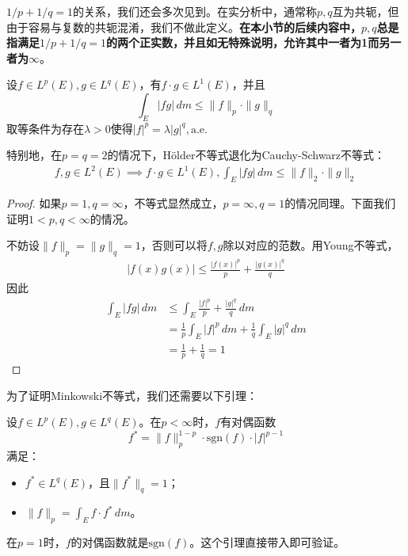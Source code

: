 $1/p+1/q=1$的关系，我们还会多次见到。在实分析中，通常称$p,q$互为共轭，但由于容易与复数的共轭混淆，我们不做此定义。\textbf{在本小节的后续内容中，$p,q$总是指满足$1/p+1/q=1$的两个正实数，并且如无特殊说明，允许其中一者为1而另一者为$\infty$}。

\begin{theorem}[Hölder不等式]
    设$f\in L^p(E),g\in L^q(E)$，有$f\cdot g\in L^1(E)$，并且
    \[\int_{E}|fg|\,dm\leq \|f\|_p\cdot \|g\|_q\]
    取等条件为存在$\lambda>0$使得$|f|^p=\lambda |g|^q,\text{a.e.}$
\end{theorem}
特别地，在$p=q=2$的情况下，Hölder不等式退化为Cauchy-Schwarz不等式：\begin{align*}
    f,g\in L^2(E)\implies f\cdot g\in L^1(E),\int_{E}|fg|\,dm\leq \|f\|_2\cdot \|g\|_2
\end{align*}
\begin{proof}
    如果$p=1,q=\infty$，不等式显然成立，$p=\infty,q=1$的情况同理。下面我们证明$1<p,q<\infty$的情况。

    不妨设$\|f\|_p=\|g\|_q=1$，否则可以将$f,g$除以对应的范数。用Young不等式，\begin{align*}
        |f(x)g(x)|\leq \frac{|f(x)|^p}{p}+\frac{|g(x)|^q}{q}
    \end{align*}
    因此\begin{align*}
        \int_{E}|fg|\,dm&\leq \int_{E}\frac{|f|^p}{p}+\frac{|g|^q}{q}\,dm\\
        &=\frac{1}{p}\int_{E}|f|^p\,dm+\frac{1}{q}\int_{E}|g|^q\,dm\\
        &=\frac{1}{p}+\frac{1}{q}=1
    \end{align*}
\end{proof}

为了证明Minkowski不等式，我们还需要以下引理：
\begin{lemma}
    设$f\in L^p(E),g\in L^q(E)$。在$p<\infty$时，$f$有对偶函数
    $$f^*=\|f\|_p^{1-p}\cdot\text{sgn}(f)\cdot |f|^{p-1}$$
    满足：\begin{itemize}
        \item $f^*\in L^q(E)$，且$\|f^*\|_q=1$；
        \item $\|f\|_p=\int_{E}f\cdot f^*\,dm$。
    \end{itemize}
\end{lemma}

在$p=1$时，$f$的对偶函数就是$\text{sgn}(f)$。这个引理直接带入即可验证。

